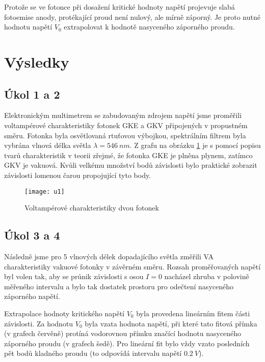 \documentclass{protokol}
\begin{document}
    Protože se ve fotonce při dosažení kritické hodnoty napětí projevuje slabá fotoemise anody, protékající proud není nulový, ale mírně záporný. Je proto nutné hodnotu napětí $V_0$ extrapolovat k hodnotě nasyceného záporného proudu.
    
  \section*{Výsledky}

    \subsection*{Úkol 1 a 2}

      Elektronickým multimetrem se zabudovaným zdrojem napětí jsme proměřili voltampérové charakteristiky fotonek GKE a GKV připojených v propustném směru. Fotonka byla osvě\-tlovaná rtuťovou výbojkou, spektrálním filtrem byla vybrána vlnová délka světla $\lambda = \SI{546}{nm}$. Z grafu na obrázku \ref{fig:u1} je s pomocí popisu tvarů charakteristik v teorii zřejmé, že fotonka GKE je plněna plynem, zatímco GKV je vakuová. Kvůli velkému množství bodů závislosti bylo praktické zobrazit závislosti lomenou čarou propojující tyto body.

      \begin{figure}[H]
        \centering
        \texttt{[image: u1]}
        \caption{Voltampérové charakteristiky dvou fotonek}
        \label{fig:u1}
      \end{figure}

    \subsection*{Úkol 3 a 4}

      Následně jsme pro 5 vlnových délek dopadajícího světla změřili VA charakteristiky vakuové fotonky v závěrném směru. Rozsah proměřovaných napětí byl volen tak, aby se průnik závislosti s osou $I = 0$ nacházel zhruba v polovině měřeného intervalu a bylo tak dostatek prostoru pro odečtení nasyceného záporného napětí. 

      Extrapolace hodnoty kritického napětí $V_0$ byla provedena lineárním fitem části závislosti. Za hodnotu $V_0$ byla vzata hodnota napětí, při které tato fitová přímka (v grafech červěně) protíná vodorovnou přímku značící hodnotu nasyceného záporného proudu (v grafech šedě). Pro lineární fit bylo vždy vzato posledních pět bodů kladného proudu (to odpovídá intervalu napětí $\SI{0.2}{V}$).
\end{document}
